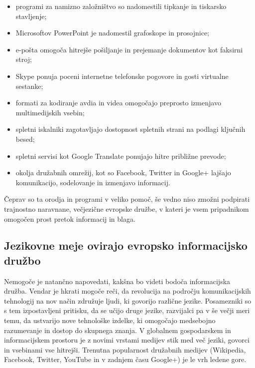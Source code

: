 \begin{multicols}{2}
\begin{itemize}
\item programi za namizno založništvo so nadomestili tipkanje in tiskarsko stav\-ljenje;
\item Microsoftov PowerPoint je nadomestil grafo\-skope in prosojnice;
\item e-pošta omogoča hitrejše pošiljanje in prejemanje dokumentov kot faksirni stroj;
\item Skype ponuja poceni internetne telefonske pogo\-vore in gosti virtualne sestanke;
\item formati za kodiranje avdia in videa omogočajo preprosto izmenjavo multimedijskih vsebin;
\item spletni iskalniki zagotav\-ljajo dostopnost spletnih strani na podlagi ključnih besed;
\item spletni servisi kot Google Translate ponujajo hitre približne prevode;
\item okolja družabnih omrežij, kot so Facebook, Twitter in Google+ lajšajo komunikacijo, sodelovanje in izmenjavo informacij.
\end{itemize}

Čeprav so ta orodja in programi v veliko pomoč, še vedno niso zmožni podpirati trajnostno naravnane, večjezične evropske družbe, v kateri je vsem pripadnikom omogočen prost pretok informacij in blaga.

\subsection{Jezikovne meje ovirajo evropsko informacij\-sko družbo}
  
Nemogoče je natančno napovedati, kakšna bo videti bodoča informacij\-ska družba. Vendar je hkrati mogoče reči, da revolucija na področju komunikacij\-skih tehnologij na nov način združuje ljudi, ki go\-vorijo različne jezike. Posamezniki so s tem izpostav\-ljeni pritisku, da se učijo druge jezike, razvijalci pa v še večji meri temu, da ustvarijo nove tehnološke izdelke, ki omogočajo medsebojno razumevanje in dostop do skupnega znanja. 
V globalnem gospodarskem in informacij\-skem prostoru je z novimi vrstami medijev stik med več jeziki, go\-vorci in vsebinami vse hitrejši. Trenutna popularnost družabnih medijev (Wikipedia, Facebook, Twitter, YouTube in v zadnjem času Google+) je le vrh ledene gore.



\end{multicols}
